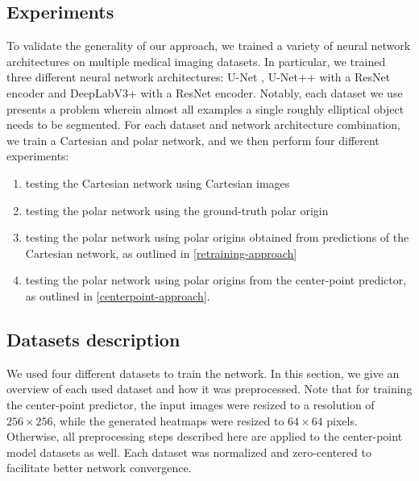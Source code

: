   \subsection{Experiments} \label{experiments}
  
To validate the generality of our approach, we trained a variety of neural network architectures on 
multiple medical imaging datasets. In particular, we trained three different neural network 
architectures: U-Net \cite{ronnebergerUNetConvolutionalNetworks2015}, U-Net++ 
\cite{zhouUNetNestedUNet2018a} with a ResNet encoder and DeepLabV3+ 
\cite{chenEncoderDecoderAtrousSeparable2018a} with a ResNet encoder. Notably, each dataset we use presents a problem wherein almost all examples a single roughly elliptical object needs to be segmented. 
For each dataset and network architecture combination, we train a Cartesian and polar network, and we then 
perform four different experiments: 

\begin{enumerate}
	\item{testing the Cartesian network using Cartesian images}
	\item{testing the polar network using the ground-truth polar origin}
	\item{testing the polar network using polar origins obtained from predictions of the Cartesian network, as outlined in \ref{retraining-approach}}
	\item{testing the polar network using polar origins from the center-point predictor, as outlined in \ref{centerpoint-approach}}.
\end{enumerate}

    \subsection{Datasets description}

We used four different datasets to train the network. In this section, we give an overview of each used dataset and how it was preprocessed. Note that for training the center-point predictor, the input images were resized to a resolution of $256 \times 256$, while the generated heatmaps were resized to $64 \times 64$ pixels. Otherwise, all preprocessing steps described here are applied to the center-point model datasets as well. Each dataset was normalized and zero-centered to facilitate better network convergence. 

